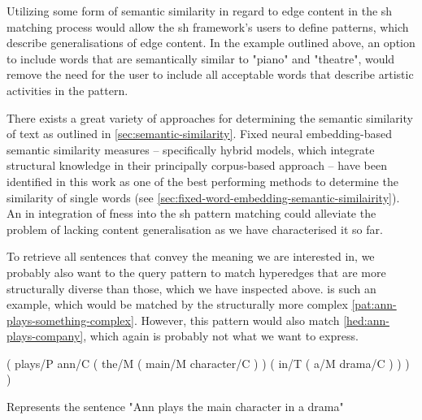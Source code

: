\documentclass[11pt]{scrreprt}
\let\cite\parencite  %
\begin{document}
Utilizing some form of semantic similarity in regard to edge content in the \gls{sh} matching process would allow the \gls{sh} framework's users to define patterns, which describe generalisations of edge content. In the example outlined above, an option to include words that are semantically similar to "piano" and "theatre", would remove the need for the user to include all acceptable words that describe artistic activities in the pattern. 

There exists a great variety of approaches for determining the semantic similarity of text as outlined in \cref{sec:semantic-similarity}. Fixed neural embedding-based semantic similarity measures -- specifically hybrid models, which integrate structural knowledge in their principally corpus-based approach -- have been identified in this work as one of the best performing methods to determine the similarity of single words (see \cref{sec:fixed-word-embedding-semantic-similairity}).
An in integration of \gls{fness} into the \gls{sh} pattern matching could alleviate the problem of lacking content generalisation as we have characterised it so far.



To retrieve all sentences that convey the meaning we are interested in, we probably also want to the query pattern to match hyperedges that are more structurally diverse than those, which we have inspected above.  is such an example, which would be matched by the structurally more complex \cref{pat:ann-plays-something-complex}. However, this pattern would also match \cref{hed:ann-plays-company}, which again is probably not what we want to express. 

\begin{hedge}[h!]
  \normalfont\sffamily
  \centering
 ( plays/P ann/C ( the/M ( main/M character/C ) ) ( in/T ( a/M drama/C ) ) ) )
  \caption{Represents the sentence "Ann plays the main character in a drama"}
  \label{hed:ann-plays-drama}
\end{hedge}
\end{document}
